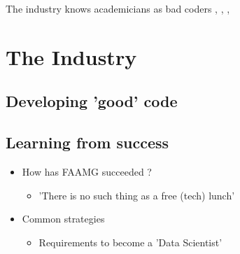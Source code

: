 \documentclass[usenames,dvipsnames]{beamer}
\theoremstyle{plain}
\theoremstyle{definition}
\begin{document}
\begin{frame}{\setframetitle{}}

\centering \large The industry knows academicians as bad
coders , , , 

\end{frame}


\section{The Industry}

\subsection{Developing 'good' code}
\begin{frame}{\setframetitle{}}
  {
\begin{figure}
{}
 \end{figure}
 }
 \end{frame}



\subsection{Learning from success}




\begin{frame}{\setframetitle{}}

\begin{itemize}

\item How has FAAMG  succeeded ?
\begin{itemize}
\item 'There is no such thing as a free (tech) lunch'
\end{itemize}
\item Common strategies
\begin{itemize}
\item Requirements to become a 'Data Scientist' 
\end{itemize}

\end{itemize}
\end{frame}
\end{document}
